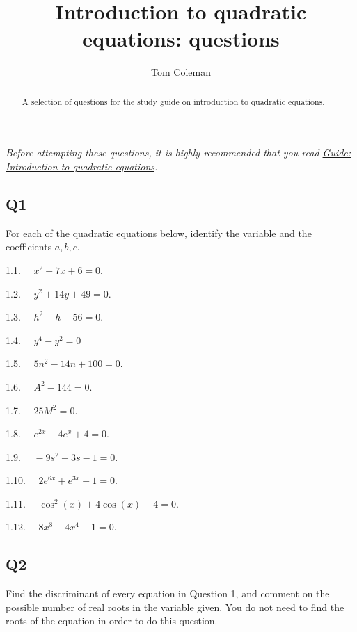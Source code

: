 \documentclass[
  12pt,
  a4paper, oneside]{starmastarticle}
\title{Introduction to quadratic equations: questions}
\author{Tom Coleman}
\date{}
\begin{document}
\maketitle
\begin{abstract}
A selection of questions for the study guide on introduction to
quadratic equations.
\end{abstract}
\ifdefined\Shaded\renewenvironment{Shaded}{\begin{tcolorbox}[sharp corners, boxrule=0pt, borderline west={3pt}{0pt}{shadecolor}, frame hidden, interior hidden, enhanced, breakable]}{\end{tcolorbox}}\fi

\emph{Before attempting these questions, it is highly recommended that
you read \href{introtoquadratics.qmd}{Guide: Introduction to quadratic
equations}.}

\hypertarget{q1}{%
\subsection*{Q1}\label{q1}}

For each of the quadratic equations below, identify the variable and the
coefficients \(a,b,c\).

1.1. \(\quad x^2 - 7x + 6 = 0\).

1.2. \(\quad y^2 + 14y + 49 = 0\).

1.3. \(\quad h^2 - h - 56 = 0\).

1.4. \(\quad y^4 - y^2 = 0\)

1.5. \(\quad 5n^2 - 14n + 100 = 0\).

1.6. \(\quad A^2 - 144 = 0\).

1.7. \(\quad 25M^2= 0\).

1.8. \(\quad e^{2x} - 4e^x + 4 = 0\).

1.9. \(\quad -9s^2 + 3s - 1 = 0\).

1.10. \(\quad 2e^{6x} + e^{3x} + 1 = 0\).

1.11. \(\quad \cos^2(x) + 4\cos(x) - 4 = 0\).

1.12. \(\quad 8x^8 - 4x^4 - 1 = 0\).

\hypertarget{q2}{%
\subsection*{Q2}\label{q2}}

Find the discriminant of every equation in Question 1, and comment on
the possible number of real roots in the variable given. You do not need
to find the roots of the equation in order to do this question.
\end{document}

